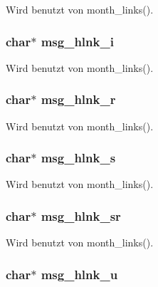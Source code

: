 Wird benutzt von month\_\-links().
\subsubsection{\setlength{\rightskip}{0pt plus 5cm}char$\ast$ {\bf msg\_\-hlnk\_\-i}}\label{lang_8h_20fdd1ef12a927f7b070c9fe5b21fe8a}




Wird benutzt von month\_\-links().
\subsubsection{\setlength{\rightskip}{0pt plus 5cm}char$\ast$ {\bf msg\_\-hlnk\_\-r}}\label{lang_8h_97ec2c175568d35b3720480b56bc5e5e}




Wird benutzt von month\_\-links().
\subsubsection{\setlength{\rightskip}{0pt plus 5cm}char$\ast$ {\bf msg\_\-hlnk\_\-s}}\label{lang_8h_cfaa06480a2bdd2784ddd82913829eb5}




Wird benutzt von month\_\-links().
\subsubsection{\setlength{\rightskip}{0pt plus 5cm}char$\ast$ {\bf msg\_\-hlnk\_\-sr}}\label{lang_8h_6dfdb6f431662bebeaab6328c39c6193}




Wird benutzt von month\_\-links().
\subsubsection{\setlength{\rightskip}{0pt plus 5cm}char$\ast$ {\bf msg\_\-hlnk\_\-u}}\label{lang_8h_f4980dbff649e1801ea68f5dbd556ab5}




